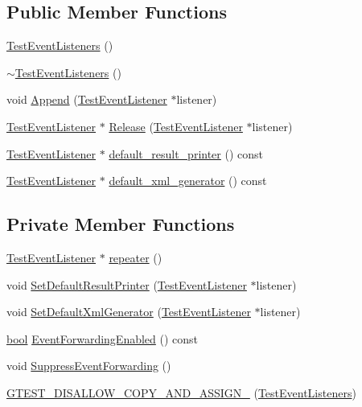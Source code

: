 \subsection*{Public Member Functions}
\begin{DoxyCompactItemize}
\item 
\hyperlink{classtesting_1_1TestEventListeners_af0716e4067a6f357ee5ea18802a591dd}{Test\+Event\+Listeners} ()
\item 
\hyperlink{classtesting_1_1TestEventListeners_abe9fbbbedf7f55fa898abfae60aa4913}{$\sim$\+Test\+Event\+Listeners} ()
\item 
void \hyperlink{classtesting_1_1TestEventListeners_a1207dce74d64c1c39ffa6105560536a0}{Append} (\hyperlink{classtesting_1_1TestEventListener}{Test\+Event\+Listener} $\ast$listener)
\item 
\hyperlink{classtesting_1_1TestEventListener}{Test\+Event\+Listener} $\ast$ \hyperlink{classtesting_1_1TestEventListeners_a038c9fa1975f84d6f3d25b52bc7bccdd}{Release} (\hyperlink{classtesting_1_1TestEventListener}{Test\+Event\+Listener} $\ast$listener)
\item 
\hyperlink{classtesting_1_1TestEventListener}{Test\+Event\+Listener} $\ast$ \hyperlink{classtesting_1_1TestEventListeners_a6293443acb5af942eeec638b6aa6dcf2}{default\+\_\+result\+\_\+printer} () const
\item 
\hyperlink{classtesting_1_1TestEventListener}{Test\+Event\+Listener} $\ast$ \hyperlink{classtesting_1_1TestEventListeners_aa880de6ddfc3f5824371853c6846abbd}{default\+\_\+xml\+\_\+generator} () const
\end{DoxyCompactItemize}
\subsection*{Private Member Functions}
\begin{DoxyCompactItemize}
\item 
\hyperlink{classtesting_1_1TestEventListener}{Test\+Event\+Listener} $\ast$ \hyperlink{classtesting_1_1TestEventListeners_ad28af964081553de465fbfc1c5a46650}{repeater} ()
\item 
void \hyperlink{classtesting_1_1TestEventListeners_aeaab55da7c18c35fb12c27c18ff99955}{Set\+Default\+Result\+Printer} (\hyperlink{classtesting_1_1TestEventListener}{Test\+Event\+Listener} $\ast$listener)
\item 
void \hyperlink{classtesting_1_1TestEventListeners_a36dbac47563ef8bb78cb467d11f5b4d9}{Set\+Default\+Xml\+Generator} (\hyperlink{classtesting_1_1TestEventListener}{Test\+Event\+Listener} $\ast$listener)
\item 
\hyperlink{classbool}{bool} \hyperlink{classtesting_1_1TestEventListeners_aa1878baf16a50f30f6435fad3c68ef3f}{Event\+Forwarding\+Enabled} () const
\item 
void \hyperlink{classtesting_1_1TestEventListeners_a7132550dc1c50bb3399a6d6d3fc9be3d}{Suppress\+Event\+Forwarding} ()
\item 
\hyperlink{classtesting_1_1TestEventListeners_a31d12292abc277dedbb7dc7748a6a60e}{G\+T\+E\+S\+T\+\_\+\+D\+I\+S\+A\+L\+L\+O\+W\+\_\+\+C\+O\+P\+Y\+\_\+\+A\+N\+D\+\_\+\+A\+S\+S\+I\+G\+N\+\_\+} (\hyperlink{classtesting_1_1TestEventListeners}{Test\+Event\+Listeners})
\end{DoxyCompactItemize}

